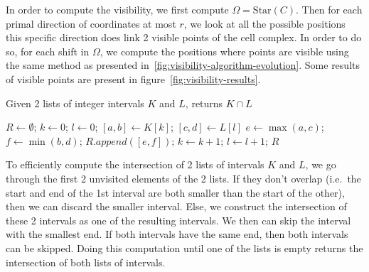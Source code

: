 In order to compute the visibility, we first compute $\Omega = \text{Star}(C)$. Then for each primal direction of
coordinates at most $r$, we look at all the possible positions this specific direction does link 2 visible points
of the cell complex. In order to do so, for each shift in $\Omega$, we compute the positions where points are
visible using the same method as presented in~\ref{fig:visibility-algorithm-evolution}. Some results of visible
points are present in figure~\ref{fig:visibility-results}.

\begin{algorithm}
  \caption{Given 2 lists of integer intervals $K$ and $L$, returns $K \cap L$}
  \label{alg:intersection}
  \begin{algorithmic}
    \State $R \gets \emptyset$; $k \gets 0$; $l \gets 0$;
    \State $[a,b] \gets K[k]$; $[c,d] \gets L[l]$
    \State $e \gets \max(a, c)$; $f \gets \min(b, d)$;
    $R.append([e, f])$;
    \EndIf
    $k \gets k+1$;
    \EndIf
    $l \gets l+1$;
    \EndIf
    \EndWhile
    \State \Return $R$
    \EndFunction
  \end{algorithmic}
\end{algorithm}

To efficiently compute the intersection of 2 lists of intervals $K$ and $L$, we go through the first 2 unvisited
elements of the 2 lists. If they don't overlap (i.e.\ the start and end of the 1st interval are both smaller than
the start of the other), then we can discard the smaller interval. Else, we construct the intersection of these
2 intervals as one of the resulting intervals. We then can skip the interval with the smallest end. If both
intervals have the same end, then both intervals can be skipped. Doing this computation until one of the lists
is empty returns the intersection of both lists of intervals.


